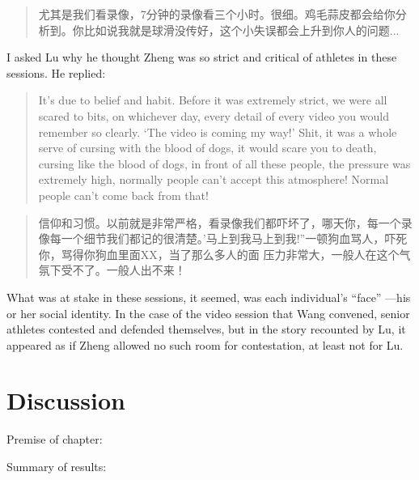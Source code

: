 \begin{CJK}{UTF8}{gbsn}
\begin{quotation}
    尤其是我们看录像，7分钟的录像看三个小时。很细。鸡毛蒜皮都会给你分析到。你比如说我就是球滑没传好，这个小失误都会上升到你人的问题...
\end{quotation}


I asked Lu why he thought Zheng was so strict and critical of athletes in these sessions.  He replied:

\begin{quotation}
    It's due to belief and habit. Before it was extremely strict, we were all scared to bits, on whichever day, every detail of every video you would remember so clearly. `The video is coming my way!'  Shit, it was a whole serve of cursing with the blood of dogs, it would scare you to death, cursing like the blood of dogs, in front of all these people, the pressure was extremely high, normally people can’t accept this atmosphere! Normal people can’t come back from that!
\end{quotation}


  \begin{quotation}
      信仰和习惯。以前就是非常严格，看录像我们都吓坏了，哪天你，每一个录像每一个细节我们都记的很清楚。'马上到我马上到我!''一顿狗血骂人，吓死你，骂得你狗血里面XX，当了那么多人的面 压力非常大，一般人在这个气氛下受不了。一般人出不来！
  \end{quotation}


What was at stake in these sessions, it seemed, was each individual's ``face'' ---his or her social identity.  In the case of the video session that Wang convened, senior athletes contested and defended themselves, but in the story recounted by Lu, it appeared as if Zheng allowed no such room for contestation, at least not for Lu.




  \section{Discussion}

Premise of chapter:

Summary of results:




\end{CJK}
